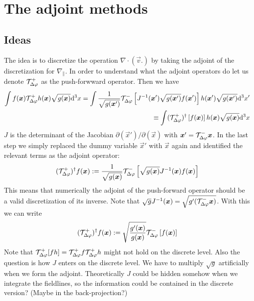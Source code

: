 \section{The adjoint methods}
\subsection{Ideas}
The idea is to discretize the operation $\nabla\cdot( \vec v .)$ by
taking the adjoint of the discretization for $\nabla_\parallel$. 
In order to understand what the adjoint operators do let us denote $\mathcal T^+_{\Delta\varphi}$ as the push-forwward operator. Then we have
\begin{align}
    \int f(\vec x) \Tp h(\vec x) \sqrt{g(\vec x)}\d^3x%
    =  \int \frac{1}{\sqrt{g(\vec x')}}\Tm\left[J^{-1}(\vec x')\sqrt{g(\vec x')}f(\vec x')\right] h(\vec x')\sqrt{g(\vec x')}   \d^3x' \nonumber \\
    \equiv  \int (\Tp)^\dagger\left[f(\vec x)\right] h(\vec x)\sqrt{g(\vec x)}   \d^3x
    \label{}
\end{align}
$J$ is the determinant of the Jacobian $\partial(\vec x')/\partial(\vec x)$ with ${\boldsymbol{x}}' = \mathcal T^-_{\Delta\varphi} {\boldsymbol{x}}$.
In the last step we simply replaced the dummy variable $\vec x'$ with $\vec x$ again and identified the relevant terms
as the adjoint operator:
\begin{align}
    (\mathcal T^+_{\Delta\varphi})^\dagger f({\boldsymbol{x}} ) := \frac{1}{\sqrt{g({\boldsymbol{x}})}} \mathcal T^-_{\Delta\varphi}\left[\sqrt{g({\boldsymbol{x}})} J^{-1}({\boldsymbol{x}}) f({\boldsymbol{x}}) \right]
    \label{}
\end{align}
This means that numerically the adjoint of the push-forward 
operator should be a valid discretization of its inverse.
Note that $\sqrt{g}J^{-1}({\boldsymbol{x}}) = \sqrt{g'(\mathcal T^-_{\Delta\varphi} {\boldsymbol{x}})}$.
With this we can write
\begin{align}
    (\mathcal T^+_{\Delta\varphi})^\dagger f({\boldsymbol{x}} ) := \sqrt{\frac{g'({\boldsymbol{x}})}{g({\boldsymbol{x}})}} \mathcal T^-_{\Delta\varphi}\left[f({\boldsymbol{x}}) \right]
    \label{}
\end{align}
Note that $\mathcal T^+_{\Delta\varphi} [fh] = \mathcal T^+_{\Delta\varphi} f \mathcal T^+_{\Delta\varphi} h$ might not
hold on the discrete level. Also the question is how $J$ enters 
on the discrete level. We have to multiply $\sqrt{g}$ artificially when we form the adjoint. 
Theoretically $J$ could be hidden somehow when we integrate the fieldlines, so the information could be contained in the discrete version? (Maybe in the back-projection?)

